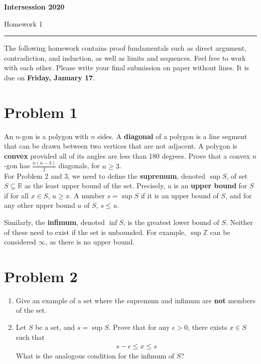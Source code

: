\documentclass[11pt]{article}
\newcommand{\R}{\ensuremath{\mathbb R}}
\newcommand{\Z}{\ensuremath{\mathbb Z}}
\theoremstyle{plain}
\theoremstyle{definition}
\theoremstyle{remark}
\begin{document}

 \hfill {\bf Intersession 2020}

 \hfill 
{Homework 1}

\noindent \rule[0.1in]{\textwidth}{0.4pt}

The following homework contains proof fundamentals such as direct argument, contradiction, and induction, as well as limits and sequences. Feel free to work with each other. Please write your final submission on paper without lines. It is due on {\bf Friday, January 17}.


\section*{Problem 1}

An $n$-gon is a polygon with $n$ sides. A {\bf diagonal} of a polygon is a line segment that can be drawn between two vertices that are not adjacent. A polygon is {\bf convex} provided all of its angles are less than 180 degrees. Prove that a convex $n$-gon has $\frac{n(n-3)}{2}$ diagonals, for $n \geq 3$.\\

For Problem 2 and 3, we need to define the {\bf supremum}, denoted $\sup S$, of set $S \subseteq \R$ as the least upper bound of the set. Precisely, $u$ is an {\bf upper bound} for $S$ if for all $x \in S$, $u \geq x$. A number $s = \sup S$ if it is an upper bound of $S$, and for any other upper bound $u$ of $S$, $s \leq u$.

Similarly, the {\bf infimum}, denoted $\inf S$, is the greatest lower bound of $S$. Neither of these need to exist if the set is unbounded. For example, $\sup \Z$ can be considered $\infty$, as there is no upper bound.

\section*{Problem 2}

\begin{enumerate}
    \item Give an example of a set where the supremum and infimum are {\bf not} members of the set.
    \item Let $S$ be a set, and $s = \sup S$. Prove that for any $\epsilon > 0$, there exists $x \in S$ such that
    \begin{align*}
        s - \epsilon \leq x \leq s
    \end{align*}
    What is the analogous condition for the infimum of $S$?
\end{enumerate}
\end{document}
